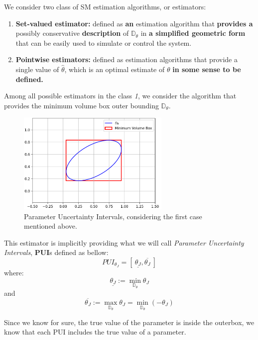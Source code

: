 We consider two class of SM estimation algorithms, or estimators: 
\begin{enumerate}
\item \textbf{Set-valued estimator:} defined as \textbf{an} estimation algorithm that \textbf{provides a} possibly conservative \textbf{description} of \(\mathbb{D}_\theta\) in \textbf{a simplified geometric form} that can be easily used to simulate or control the system.
\item \textbf{Pointwise estimators:} defined as estimation algorithms that provide a single value of \(\hat{\theta}\), which is an optimal estimate of \(\theta\) \textbf{in some sense to be defined.}
\end{enumerate}

Among all possible estimators in the class \textit{1}, we consider the algorithm that provides the minimum volume box outer bounding \(\mathbb{D}_\theta\).\\

\begin{figure}[htbp]  %
    \centering
    \includegraphics[width=0.65\textwidth]{images/pui.png}
    \caption{Parameter Uncertainty Intervals, considering the first case mentioned above.}
    \label{fig:PUI}
\end{figure}


This estimator is implicitly providing what we will call \textit{Parameter Uncertainty Intervals}, \textbf{PUI}s defined as bellow: 
\[
PUI_{\theta_J} = \left[\: \underline{\theta_J}, \overline{\theta_J} \: \right]
\]
where: 
\[
\underline{\theta_J} := \min\limits_{\mathbb{D}_\theta} \theta_J
\]
and
\[
\overline{\theta_J} := \max\limits_{\mathbb{D}_\theta} \theta_J = \min\limits_{\mathbb{D}_\theta} (-\theta_J)
\]

Since we know for sure, the true value of the parameter is inside the outerbox, we know that each PUI includes the true value of a parameter.\\

